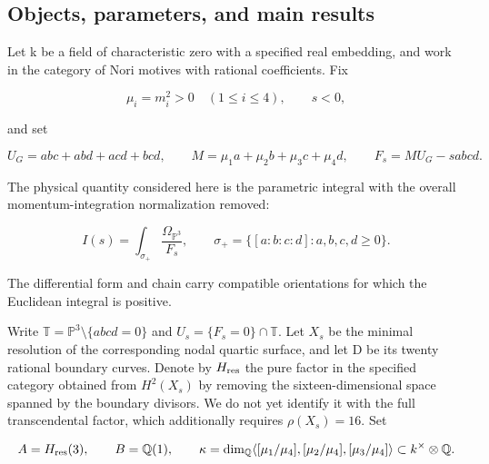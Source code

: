 \documentclass[11pt,a4paper,oneside]{article}
\theoremstyle{plain}
\theoremstyle{definition}
\theoremstyle{remark}
\numberwithin{equation}{section}
\begin{document}
\subsection{Objects, parameters, and main results}\label{sec:core:1}

Let k be a field of characteristic zero with a specified real embedding, and work in the category of Nori motives with rational coefficients. Fix

\begin{equation}
\mu_i=m_i^2>0\quad(1\leq i\leq4),\qquad s<0,
\end{equation}

and set

\begin{equation}
U_G=abc+abd+acd+bcd,\qquad
 M=\mu_1a+\mu_2b+\mu_3c+\mu_4d,\qquad
 F_s=M U_G-sabcd.                                      \label{eq:core:1.1}
\end{equation}

The physical quantity considered here is the parametric integral with the overall momentum-integration normalization removed:

\begin{equation}
I(s)=\int_{\sigma_+}\frac{\Omega_{\mathbb P^3}}{F_s},
 \qquad \sigma_+=\{[a:b:c:d]:a,b,c,d\geq0\}.             \label{eq:core:1.2}
\end{equation}

The differential form and chain carry compatible orientations for which the Euclidean integral is positive.

Write \(\mathbb T=\mathbb P^3\setminus\{abcd=0\}\) and \(U_s=\{F_s=0\}\cap\mathbb T\). Let \(X_s\) be the minimal resolution of the corresponding nodal quartic surface, and let D be its twenty rational boundary curves. Denote by \(H_{\rm res}\) the pure factor in the specified category obtained from \(H^2(X_s)\) by removing the sixteen-dimensional space spanned by the boundary divisors. We do not yet identify it with the full transcendental factor, which additionally requires \(\rho(X_s)=16\). Set

\begin{equation}
A=H_{\rm res}(3),\qquad B=\mathbb Q(1),\qquad
 \kappa=\dim_{\mathbb Q}\langle[\mu_1/\mu_4],
 [\mu_2/\mu_4],[\mu_3/\mu_4]\rangle\subset k^\times\otimes\mathbb Q.
                                                               \label{eq:core:1.3}
\end{equation}
\end{document}
